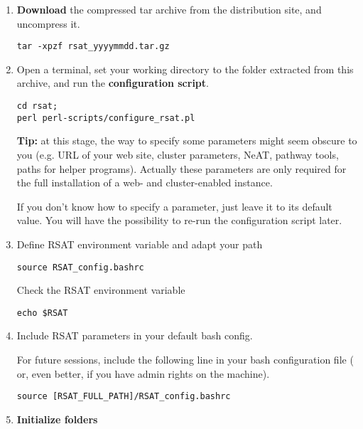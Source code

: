 \documentclass[12pt,a4paper, oneside]{scrreprt} %
\begin{document}
\begin{enumerate}
\item \textbf{Download} the compressed tar archive from the \RSAT
  distribution site, and uncompress it.

  \begin{lstlisting}
tar -xpzf rsat_yyyymmdd.tar.gz
  \end{lstlisting}
  
  
\item Open a terminal, set your working directory to the 
  folder extracted from this archive, and run the \RSAT
  \textbf{configuration script}.

  \begin{lstlisting}
cd rsat; 
perl perl-scripts/configure_rsat.pl
  \end{lstlisting}

  \textbf{Tip:} at this stage, the way to specify some parameters
  might seem obscure to you (e.g. URL of your web site, cluster
  parameters, NeAT, pathway tools, paths for helper
  programs). Actually these parameters are only required for the full
  installation of a web- and cluster-enabled \RSAT instance. 

  If you don't know how to specify a parameter, just leave it to its
  default value. You will have the possibility to re-run the
  configuration script later.

\item Define RSAT environment variable and adapt your path

  \begin{lstlisting}
source RSAT_config.bashrc
  \end{lstlisting}

Check the RSAT environment variable

  \begin{lstlisting}
echo $RSAT
  \end{lstlisting}

\item Include RSAT parameters in your default bash config.

For future sessions, include the following line in your bash
configuration file ( or, even better,
 if you have admin rights on the machine).

\begin{verbatim}
source [RSAT_FULL_PATH]/RSAT_config.bashrc
\end{verbatim}


\item \textbf{Initialize \RSAT folders}


\end{enumerate}
\end{document}
